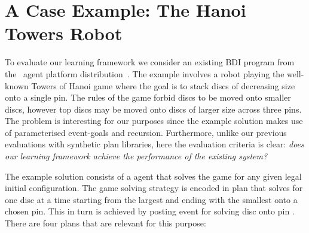 \section{A Case Example: The Hanoi Towers Robot}\label{sec:hanoi}

\newcommand{\entity}[1]{\fontNames{#1}}

To evaluate our learning framework we consider an existing BDI program
from the \JACK\ agent platform
distribution~\cite{BusettaRHL:AL99-JACK}.
The example involves a robot playing the well-known Towers of Hanoi game where the goal is to stack discs of decreasing size onto a single pin. The rules of the game forbid discs to be moved onto smaller discs, however top discs may be moved onto discs of larger size across three pins. The problem is interesting for our purposes since the example solution makes use of parameterised event-goals and recursion. Furthermore, unlike our previous evaluations \cite{Airiau:IJAT:09,Singh:AAMAS10} with synthetic plan libraries, here the evaluation criteria is clear: \emph{does our learning framework achieve the performance of the existing system?}


The example solution consists of a \entity{Player} agent that solves the game for 
any given legal initial configuration. The game solving strategy is encoded in plan
\entity{DiscStacker} that solves for one disc at a time starting from the largest
and ending with the smallest onto a chosen pin. This in turn is achieved by posting 
event  for solving disc  
onto pin . There are four plans that are relevant for this purpose:
%

